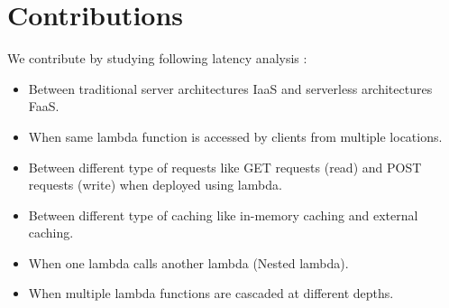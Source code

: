 \section{Contributions}

We contribute by studying following latency analysis :

\begin{itemize}
    \item Between traditional server architectures IaaS and serverless architectures FaaS.
    \item When same lambda function is accessed by clients from multiple locations.
    \item Between different type of requests like GET requests (read) and POST requests (write) when deployed using lambda.
    \item Between different type of caching like in-memory caching and external caching.
    \item When one lambda calls another lambda (Nested lambda).
    \item When multiple lambda functions are cascaded at different depths.
\end{itemize}